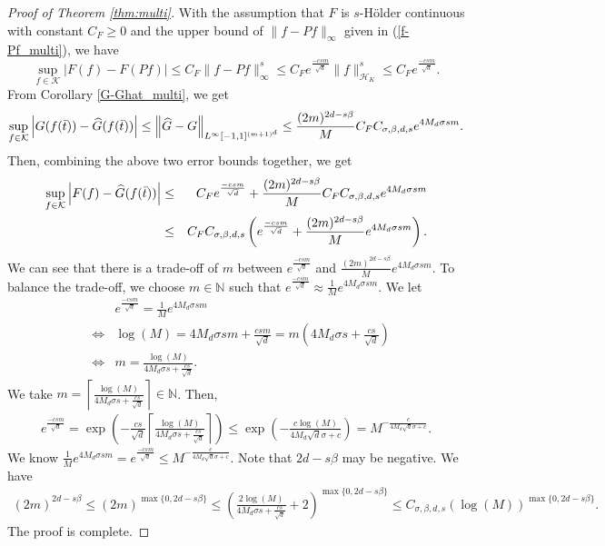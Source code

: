 \documentclass{article}
\def\NN{\mathbb N}
\numberwithin{equation}{section}
\begin{document}
\begin{appendices}
\begin{proof}[Proof of Theorem \ref{thm:multi}]
With the assumption that $F$ is  $s$-H\"{o}lder continuous with constant $C_F \geq 0$ and the upper bound of $\|f-Pf\|_\infty$ given in (\ref{f-Pf_multi}), we have
\begin{equation*}
      \sup_{f\in \mathcal{K}}| F(f) - F(Pf)| \leq  C_F \|f-Pf\|^s_\infty \leq  C_F e^{\frac{-csm}{\sqrt{d}}}\|f\|^s_{\mathcal{H}_K} \leq C_F e^{\frac{-csm}{\sqrt{d}}}. 
\end{equation*}
From Corollary \ref{G-Ghat_multi}, we get 
\begin{eqnarray*}
       \sup_{f\in \mathcal{K}}\left|G(f(\Bar{t})) - \widehat{G}(f(\Bar{t}))\right| \leq \left\|\widehat{G}-G\right\|_{L^\infty [-1,1]^{(m+1)^{d}}}\leq \frac{(2m)^{2d-s\beta}}{M}C_FC_{\sigma, \beta,d,s}e^{4M_d\sigma sm}.
\end{eqnarray*}
Then, combining the above two error bounds together, we get
\begin{eqnarray*}
       \sup_{f\in \mathcal{K}}\left| F(f) - \widehat{G}(f(\Bar{t}))\right|& \leq& C_F e^{\frac{-csm}{\sqrt{d}}} + \frac{(2m)^{2d-s\beta}}{M}C_FC_{\sigma, \beta,d,s}e^{4M_d\sigma sm}\\
       & \leq&  C_F C_{\sigma, \beta,d,s} \left(e^{\frac{-csm}{\sqrt{d}}} + \frac{(2m)^{2d-s\beta}}{M}e^{4M_d\sigma sm}\right).
\end{eqnarray*}
We can see that there is a trade-off of $m$ between $e^{\frac{-csm}{\sqrt{d}}}$ and $\frac{(2m)^{2d-s\beta}}{M}e^{4M_d\sigma sm}$. To balance the trade-off, we choose $m\in \NN$ such that $e^{\frac{-csm}{\sqrt{d}}} \approx \frac{1}{M} e^{4M_d\sigma sm}$. 
We let 
\begin{eqnarray*}
       && e^{\frac{-csm}{\sqrt{d}}} =\frac{1}{M} e^{4M_d\sigma sm}\\
     &\iff&   \log (M)  = 4M_d\sigma sm + \frac{csm}{\sqrt{d}} = m \left(4M_d\sigma s + \frac{cs}{\sqrt{d}}\right)\\
      &\iff& m=\frac{\log (M)}{4M_d\sigma s + \frac{cs}{\sqrt{d}}}.
    \end{eqnarray*}
We take $m=\left\lceil\frac{\log (M)}{4M_d\sigma s + \frac{cs}{\sqrt{d}}}\right\rceil \in \NN$. 
Then,
\begin{eqnarray*}
        e^{\frac{-csm}{\sqrt{d}}} = \exp\left(-\frac{cs}{\sqrt{d}}\left\lceil\frac{\log (M)}{4M_d\sigma s + \frac{cs}{\sqrt{d}}}\right\rceil\right) \leq \exp\left(-\frac{c\log (M)}{4M_d \sqrt{d}\sigma+c}\right) = M^{-\frac{c}{4M_d \sqrt{d}\sigma+c}}. 
\end{eqnarray*}
We know $ \frac{1}{M} e^{4M_d\sigma sm} = e^{\frac{-csm}{\sqrt{d}}} \leq M^{-\frac{c}{4M_d \sqrt{d}\sigma+c}}$. Note that $2d-s\beta$ may be negative. We have
\begin{eqnarray*}
        (2m)^{2d-s\beta}\leq (2m)^{\max\{0,2d-s\beta\}} \leq \left(\frac{2\log (M)}{4M_d\sigma s + \frac{cs}{\sqrt{d}}}+2\right)^{\max\{0,2d-s\beta\}}\leq C_{\sigma, \beta,d,s} (\log (M))^{\max\{0,2d-s\beta\}}.
    \end{eqnarray*}
The proof is complete. 
\end{proof}


\end{appendices}
\end{document}
